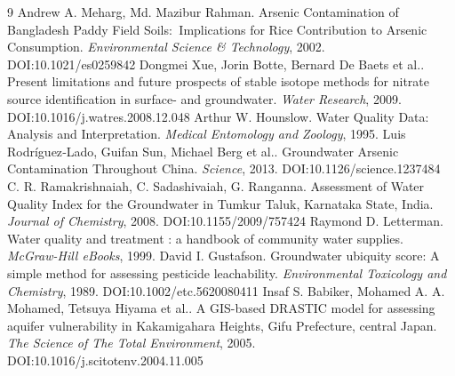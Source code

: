 \documentclass[11pt]{article}
\begin{document}
\begin{thebibliography}{9}
 Andrew A. Meharg, Md. Mazibur Rahman. Arsenic Contamination of Bangladesh Paddy Field Soils:  Implications for Rice Contribution to Arsenic Consumption. \emph{Environmental Science \& Technology}, 2002. DOI:10.1021/es0259842
 Dongmei Xue, Jorin Botte, Bernard De Baets et al.. Present limitations and future prospects of stable isotope methods for nitrate source identification in surface- and groundwater. \emph{Water Research}, 2009. DOI:10.1016/j.watres.2008.12.048
 Arthur W. Hounslow. Water Quality Data: Analysis and Interpretation. \emph{Medical Entomology and Zoology}, 1995. 
 Luis Rodríguez‐Lado, Guifan Sun, Michael Berg et al.. Groundwater Arsenic Contamination Throughout China. \emph{Science}, 2013. DOI:10.1126/science.1237484
 C. R. Ramakrishnaiah, C. Sadashivaiah, G. Ranganna. Assessment of Water Quality Index for the Groundwater in Tumkur Taluk, Karnataka State, India. \emph{Journal of Chemistry}, 2008. DOI:10.1155/2009/757424
 Raymond D. Letterman. Water quality and treatment : a handbook of community water supplies. \emph{McGraw-Hill eBooks}, 1999. 
 David I. Gustafson. Groundwater ubiquity score: A simple method for assessing pesticide leachability. \emph{Environmental Toxicology and Chemistry}, 1989. DOI:10.1002/etc.5620080411
 Insaf S. Babiker, Mohamed A. A. Mohamed, Tetsuya Hiyama et al.. A GIS-based DRASTIC model for assessing aquifer vulnerability in Kakamigahara Heights, Gifu Prefecture, central Japan. \emph{The Science of The Total Environment}, 2005. DOI:10.1016/j.scitotenv.2004.11.005
\end{thebibliography}
\end{document}
